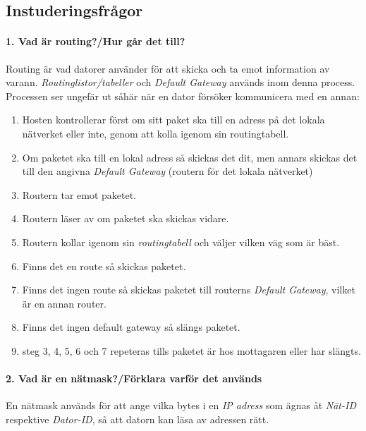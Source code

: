 \subsection{Instuderingsfrågor}

\paragraph{1. Vad är routing?/Hur går det till?}
Routing är vad datorer använder för att skicka och ta emot information av varann. \textit{Routinglistor/tabeller} och \textit{Default Gateway} används inom denna process. Processen ser ungefär ut såhär när en dator försöker kommunicera med en annan:
\begin{enumerate}
	\item Hosten kontrollerar först om sitt paket ska till en adress på det lokala nätverket eller inte, genom att kolla igenom sin routingtabell.
	\item Om paketet ska till en lokal adress så skickas det dit, men annars skickas det till den angivna \textit{Default Gateway} (routern för det lokala nätverket)
	\item Routern tar emot paketet.
	\item Routern läser av om paketet ska skickas vidare.
	\item Routern kollar igenom sin \textit{routingtabell} och väljer vilken väg som är bäst.
	\item Finns det en route så skickas paketet.
	\item Finns det ingen route så skickas paketet till routerns \textit{Default Gateway}, vilket är en annan router.
	\item Finns det ingen default gateway så slängs paketet.
	\item steg 3, 4, 5, 6 och 7 repeteras tills paketet är hos mottagaren eller har slängts.
\end{enumerate}

\paragraph{2. Vad är en nätmask?/Förklara varför det används}
En nätmask används för att ange vilka bytes i en \textit{IP adress} som ägnas åt \textit{Nät-ID} respektive \textit{Dator-ID}, så att datorn kan läsa av adressen rätt.

